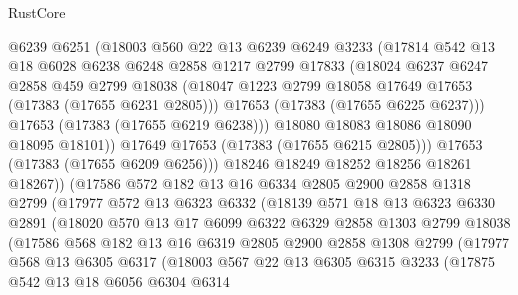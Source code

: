 \begin{lexlean}{RustCore}
\begin{coremodule}
                @6239
                @6251
                (@18003
                  @560
                  @22
                  @13
                  @6239
                  @6249
                  @3233
                  (@17814
                    @542
                    @13
                    @18
                    @6028
                    @6238
                    @6248
                    @2858
                    @1217
                    @2799
                    @17833
                    (@18024
                      @6237
                      @6247
                      @2858
                      @459
                      @2799
                      @18038
                      (@18047 @1223 @2799 @18058 @17649 @17653 (@17383 (@17655 @6231 @2805)))
                      @17653
                      (@17383 (@17655 @6225 @6237)))
                    @17653
                    (@17383 (@17655 @6219 @6238)))
                  @18080
                  @18083
                  @18086
                  @18090
                  @18095
                  @18101))
              @17649
              @17653
              (@17383 (@17655 @6215 @2805)))
            @17653
            (@17383 (@17655 @6209 @6256)))
          @18246
          @18249
          @18252
          @18256
          @18261
          @18267))
      (@17586
        @572
        @182
        @13
        @16
        @6334
        @2805
        @2900
        @2858
        @1318
        @2799
        (@17977
          @572
          @13
          @6323
          @6332
          (@18139
            @571
            @18
            @13
            @6323
            @6330
            @2891
            (@18020
              @570
              @13
              @17
              @6099
              @6322
              @6329
              @2858
              @1303
              @2799
              @18038
              (@17586
                @568
                @182
                @13
                @16
                @6319
                @2805
                @2900
                @2858
                @1308
                @2799
                (@17977
                  @568
                  @13
                  @6305
                  @6317
                  (@18003
                    @567
                    @22
                    @13
                    @6305
                    @6315
                    @3233
                    (@17875
                      @542
                      @13
                      @18
                      @6056
                      @6304
                      @6314

\end{coremodule}
\end{lexlean}
